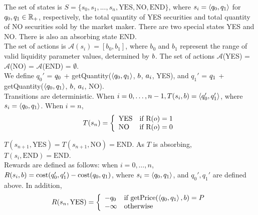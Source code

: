 
The set of states is $S = \{s_0, s_1, ..., s_n, \text{YES}, \text{NO}, \text{END}\}$, where $s_i= \left<{q_0}, {q_1}\right>$ for ${q_0}, {q_1} \in \mathbb{R}_+$, respectively, the total quantity of YES securities and total quantity of NO securities sold by the market maker. There are two special states YES and NO. There is also an absorbing state END. \\

The set of actions is $\mathcal{A}(s_i) = [b_0, b_1]$, where $b_0$ and $b_1$ represent the range of valid liquidity parameter values, determined by $b$. The set of actions $\mathcal{A}$(YES) = $\mathcal{A}$(NO) = $\mathcal{A}$(END) = $\emptyset$. \\

We define $q_0'$ = ${q_0}$ + getQuantity($\left<{q_0}, {q_1}\right>$, $b$, $a_i$, YES), and $q_1'$ = ${q_1}$ + getQuantity($\left<{q_0}, {q_1}\right>$, $b$, $a_i$, NO).\\

Transitions are deterministic. When $i=0, \ldots, n-1, T(s_i,b) = \left<q_0', q_1'\right>$, where $s_i = \left<{q_0}, {q_1}\right>$. When $i=n$,
\[ T(s_n) = \left\{
\begin{array}{ll}
      \text{YES} & \text{if R}(o) = 1 \\
      \text{NO} & \text{if R}(o) = 0 \\
\end{array} 
\right. \]

$T(s_{n+1}, \text{YES}) = T(s_{n+1}, \text{NO}) = \text{END}$. As $T$ is absorbing, $T(s_i,\text{END}) = \text{END}$.\\


Rewards are defined as follows: when $i=0,\ldots,n$, $R(s_i,b) = \text{cost}(q_0', q_1') - \text{cost}({q_0}, {q_1})$, where $s_i = \left<{q_0}, {q_1}\right>$, and $q_0', q_1'$ are defined above. In addition,
\[ R(s_{n}, \text{YES}) =  \left\{
\begin{array}{ll}
      -{q_0} & \text{if getPrice}(\left<{q_0}, {q_1}\right>, b) = P \\
      -\infty & \text{otherwise} \\
\end{array} 
\right. \]

